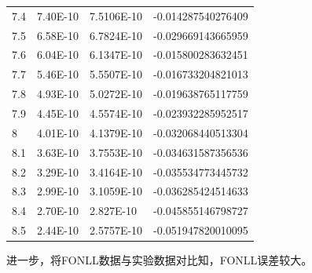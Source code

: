 \documentclass{ctexart}
\begin{document}
\begin{longtable}{l|lll}
7.4  & 7.40E-10                  & 7.5106E-10 & -0.014287540276409    \\
7.5  & 6.58E-10                  & 6.7824E-10 & -0.029669143665959    \\
7.6  & 6.04E-10                  & 6.1347E-10 & -0.015800283632451    \\
7.7  & 5.46E-10                  & 5.5507E-10 & -0.016733204821013    \\
7.8  & 4.93E-10                  & 5.0272E-10 & -0.019638765117759    \\
7.9  & 4.45E-10                  & 4.5574E-10 & -0.023932285952517    \\
8    & 4.01E-10                  & 4.1379E-10 & -0.032068440513304    \\
8.1  & 3.63E-10                  & 3.7553E-10 & -0.034631587356536    \\
8.2  & 3.29E-10                  & 3.4164E-10 & -0.035534773445732    \\
8.3  & 2.99E-10                  & 3.1059E-10 & -0.036285424514633    \\
8.4  & 2.70E-10                  & 2.827E-10  & -0.045855146798727    \\
8.5  & 2.44E-10                  & 2.5757E-10 & -0.051947820010095    \\   \hline
\end{longtable}
进一步，将FONLL数据与实验数据\cite{Aidala:2019hib}对比知，FONLL误差较大。
\end{document}

